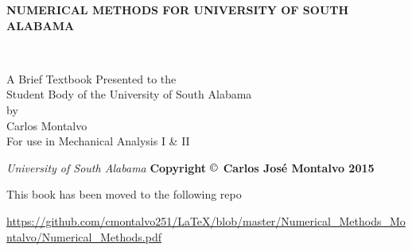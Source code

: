 \documentclass{book}
\begin{document}
\begin{center}
\begin{LARGE}{\bf NUMERICAL METHODS FOR UNIVERSITY OF SOUTH ALABAMA}\end{LARGE}\\
\large
\vspace{22 mm}
\begin{singlespace}
   A Brief Textbook Presented to the \\ 
   Student Body of the University of South Alabama \\
\vspace{22 mm}
   by\\
\vspace{22 mm}
  Carlos Montalvo \\
\vspace{22 mm}
For use in Mechanical Analysis I \& II \\
\vspace{82 mm}
\end{singlespace}
{\itshape University of South Alabama}
{\bf Copyright $\copyright$ Carlos Jos\'{e} Montalvo 2015}
\end{center}

\newpage

This book has been moved to the following repo

\url{https://github.com/cmontalvo251/LaTeX/blob/master/Numerical_Methods_Montalvo/Numerical_Methods.pdf}
\end{document}
